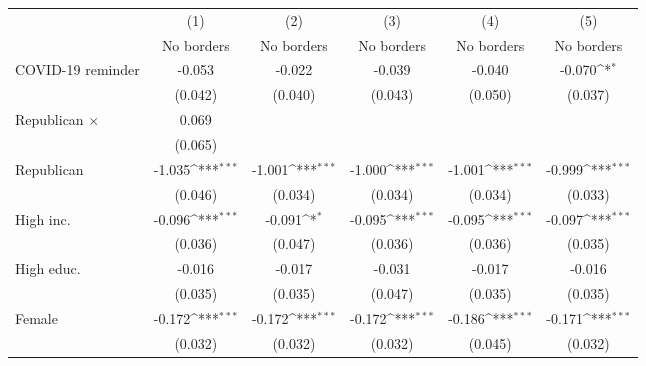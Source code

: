 {
\def\sym#1{\ifmmode^{#1}\else\(^{#1}\)\fi}
\begin{tabular}{l*{5}{c}}
\toprule
                    &\multicolumn{1}{c}{(1)}&\multicolumn{1}{c}{(2)}&\multicolumn{1}{c}{(3)}&\multicolumn{1}{c}{(4)}&\multicolumn{1}{c}{(5)}\\
                    &\multicolumn{1}{c}{No borders}&\multicolumn{1}{c}{No borders}&\multicolumn{1}{c}{No borders}&\multicolumn{1}{c}{No borders}&\multicolumn{1}{c}{No borders}\\
\midrule
COVID-19 reminder   &      -0.053         &      -0.022         &      -0.039         &      -0.040         &      -0.070\sym{*}  \\
                    &     (0.042)         &     (0.040)         &     (0.043)         &     (0.050)         &     (0.037)         \\
\addlinespace
Republican $\times$ &       0.069         &                     &                     &                     &                     \\
                    &     (0.065)         &                     &                     &                     &                     \\
\addlinespace
Republican          &      -1.035\sym{***}&      -1.001\sym{***}&      -1.000\sym{***}&      -1.001\sym{***}&      -0.999\sym{***}\\
                    &     (0.046)         &     (0.034)         &     (0.034)         &     (0.034)         &     (0.033)         \\
\addlinespace
High inc.           &      -0.096\sym{***}&      -0.091\sym{*}  &      -0.095\sym{***}&      -0.095\sym{***}&      -0.097\sym{***}\\
                    &     (0.036)         &     (0.047)         &     (0.036)         &     (0.036)         &     (0.035)         \\
\addlinespace
High educ.          &      -0.016         &      -0.017         &      -0.031         &      -0.017         &      -0.016         \\
                    &     (0.035)         &     (0.035)         &     (0.047)         &     (0.035)         &     (0.035)         \\
\addlinespace
Female              &      -0.172\sym{***}&      -0.172\sym{***}&      -0.172\sym{***}&      -0.186\sym{***}&      -0.171\sym{***}\\
                    &     (0.032)         &     (0.032)         &     (0.032)         &     (0.045)         &     (0.032)         \\

\end{tabular}}
